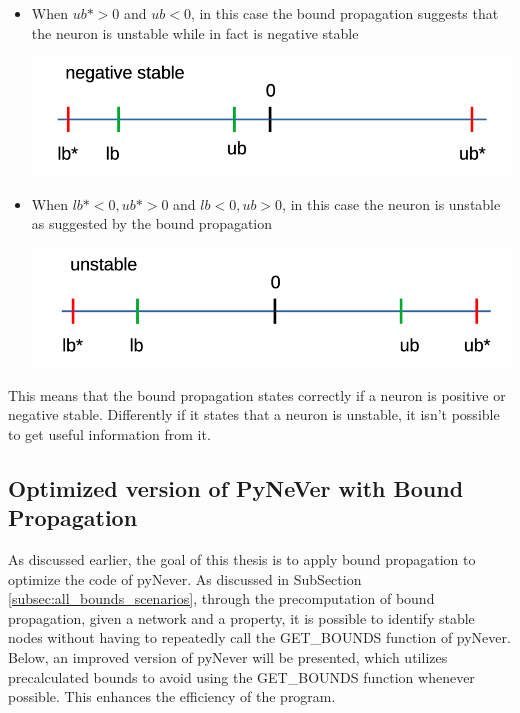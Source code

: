 \begin{itemize}
\begin{itemize}
\begin{minipage}{\linewidth}
			\end{minipage}
		\item When $ub*>0$ and $ub<0$, in this case the bound propagation suggests that the neuron is unstable while in fact is negative stable \\
			\begin{minipage}{\linewidth}
				\centering
				\includegraphics[width=\textwidth]{"Chapter6/img/unstable neg_stable"}
			\end{minipage}
		\item When $lb*<0, ub*>0$ and $lb<0, ub>0$, in this case the neuron is unstable as suggested by the bound propagation\\
			\begin{minipage}{\linewidth}
				\centering
				\includegraphics[width=\textwidth]{"Chapter6/img/unstable unstable"}
			\end{minipage}
	\end{itemize}
\end{itemize}
This means that the bound propagation states correctly if a neuron is positive or negative stable. Differently if it states that a neuron is unstable, it isn't possible to get useful information from it.


\subsection{Optimized version of PyNeVer with Bound Propagation}

As discussed earlier, the goal of this thesis is to apply bound propagation to optimize the code of pyNever. As discussed in SubSection \ref{subsec:all_bounds_scenarios}, through the precomputation of bound propagation, given a network and a property, it is possible to identify stable nodes without having to repeatedly call the GET\_BOUNDS function of pyNever. Below, an improved version of pyNever will be presented, which utilizes precalculated bounds to avoid using the GET\_BOUNDS function whenever possible. This enhances the efficiency of the program.

